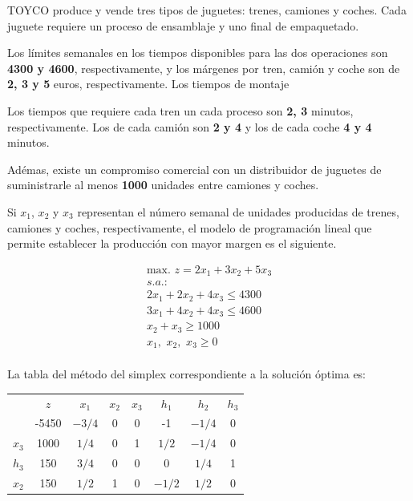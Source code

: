 TOYCO produce y vende tres tipos de juguetes: trenes, camiones y coches. 
Cada juguete requiere un proceso de ensamblaje y uno final de empaquetado. 

Los límites semanales  en los tiempos disponibles para las dos operaciones son \textbf{4300 y 4600}, respectivamente, y los márgenes por tren, camión y coche son de \textbf{2, 3 y 5 }euros, respectivamente. Los tiempos de montaje

Los tiempos que requiere cada tren un cada proceso son \textbf{2, 3} minutos, respectivamente. Los de cada camión son \textbf{2 y 4} y los de cada coche \textbf{4 y 4} minutos.

Adémas, existe un compromiso comercial con un distribuidor de juguetes de suministrarle al menos \textbf{1000} unidades entre camiones y coches.

Si $x_1$, $x_2$ y $x_3$ representan el número semanal de unidades producidas de trenes, camiones y coches, respectivamente, el modelo de programación lineal que permite establecer la producción con mayor margen es el siguiente.


\begin{equation}
\begin{split}
\mbox{max. } z = 2x_1 + 3x_2 + 5x_3\\
s.a.:\\
2x_1 + 2x_2 + 4x_3 \leq 4300\\
3x_1 + 4x_2 + 4x_3 \leq 4600\\
        x_2 +  x_3 \geq 1000\\
x_1,\,\,x_2,\,\,x_3\geq 0\\
\end{split}
\end{equation}

La tabla del método del simplex correspondiente a la solución óptima es:

\begin{center}
\begin{tabular}{c|c|cccccc|}
 & $z$ & $x_1$ & $x_2$ & $x_3$ & $h_1$ & $h_2$ & $h_3$\\ 
      & -5450 & $-3/4$ & 0 & 0 & -1 & $-1/4$ & 0 \\ 
\hline
$x_3$ & 1000  & $1/4$ & 0 & 1 & $1/2$ & $-1/4$ & 0\\ 
$h_3$ & 150  & $3/4$ & 0 & 0 & 0 & $1/4$ & 1\\ 
$x_2$ & 150  & $1/2$ & 1 & 0 & $-1/2$ & $1/2$ & 0\\ 
\hline
\end{tabular}
\end{center}





